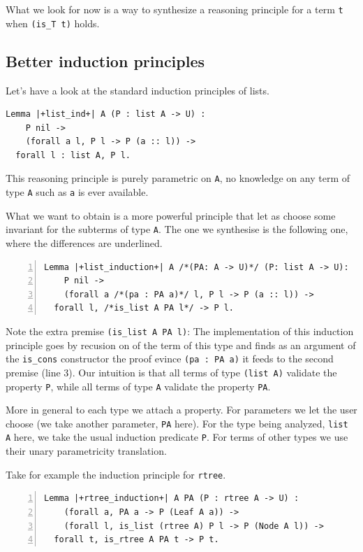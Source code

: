 \documentclass[sigplan,10pt,review]{acmart}\settopmatter{printfolios=true,printccs=false,printacmref=false}
\begin{document}
What we look for now is a way to synthesize
a reasoning principle for a term \lstinline+t+ when 
\lstinline+(is_T t)+ holds.

\subsection{Better induction principles} %

Let's have a look at the standard induction principles of lists.

\begin{lstlisting}
Lemma |+list_ind+| A (P : list A -> U) :
    P nil ->
    (forall a l, P l -> P (a :: l)) ->
  forall l : list A, P l.
\end{lstlisting}

\noindent
This reasoning principle is purely parametric on \lstinline+A+, no
knowledge on any term of type \lstinline+A+ such as \lstinline+a+ is
ever available.

What we want to obtain is a more powerful principle that let as choose
some invariant for the subterms of type \lstinline+A+. The one we
synthesise is the following one, where the differences are underlined.

\begin{lstlisting}[numbers=left]
Lemma |+list_induction+| A /*(PA: A -> U)*/ (P: list A -> U):
    P nil ->
    (forall a /*(pa : PA a)*/ l, P l -> P (a :: l)) ->
  forall l, /*is_list A PA l*/ -> P l.
\end{lstlisting}

\noindent
Note the extra premise \lstinline+(is_list A PA l)+: The
implementation of this induction principle
goes by recusion on of the term of this type and finds
as an argument of the \lstinline+is_cons+ constructor
the proof evince \lstinline+(pa : PA a)+ it feeds to the second premise
(line 3). Our intuition is that all terms of type \lstinline+(list A)+
validate the property \lstinline+P+, while all terms of type
\lstinline+A+ validate the property \lstinline+PA+.

More in general to each type we attach a property. For parameters we
let the user choose (we take another parameter, \lstinline+PA+ here).
For the type being analyzed, \lstinline+list A+ here, we take the
usual induction predicate \lstinline+P+.
For terms of other types we use their unary parametricity translation.

Take for example the induction principle for \lstinline+rtree+.

\begin{lstlisting}[numbers=left]
Lemma |+rtree_induction+| A PA (P : rtree A -> U) :
    (forall a, PA a -> P (Leaf A a)) ->
    (forall l, is_list (rtree A) P l -> P (Node A l)) ->
  forall t, is_rtree A PA t -> P t.
\end{lstlisting}
\end{document}
